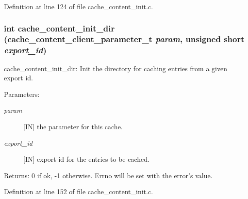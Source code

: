 Definition at line 124 of file cache\_\-content\_\-init.c.
\subsubsection[{cache\_\-content\_\-init\_\-dir}]{\setlength{\rightskip}{0pt plus 5cm}int cache\_\-content\_\-init\_\-dir (cache\_\-content\_\-client\_\-parameter\_\-t {\em param}, \/  unsigned short {\em export\_\-id})}\label{cache__content__init_8c_d776d12ad1a4a6efc8ff8246c26d0572}


cache\_\-content\_\-init\_\-dir: Init the directory for caching entries from a given export id.

\begin{Desc}
\item[Parameters:]
\begin{description}
\item[{\em param}][IN] the parameter for this cache. \item[{\em export\_\-id}][IN] export id for the entries to be cached.\end{description}
\end{Desc}
\begin{Desc}
\item[Returns:]0 if ok, -1 otherwise. Errno will be set with the error's value. \end{Desc}


Definition at line 152 of file cache\_\-content\_\-init.c.